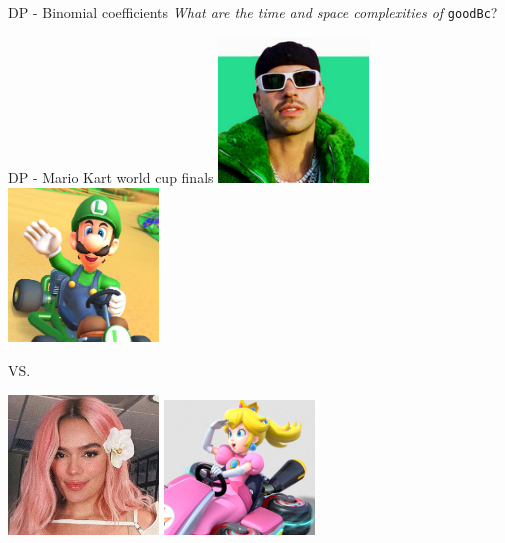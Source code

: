 \documentclass{beamer}
\begin{document}
%

\begin{frame}{DP - Binomial coefficients}
	\pause
	\emph{What are the time and space complexities of} \texttt{goodBc}?
\end{frame}

\begin{frame}{DP - Mario Kart world cup finals}
	\centering
	\includegraphics[width=0.3\textwidth]{feid.png}
	\includegraphics[width=0.3\textwidth]{luigi.png}

	VS.

	\medskip
	\includegraphics[width=0.3\textwidth]{karolg.png}
	\includegraphics[width=0.3\textwidth]{peach.png}
\end{frame}

%
\end{document}
